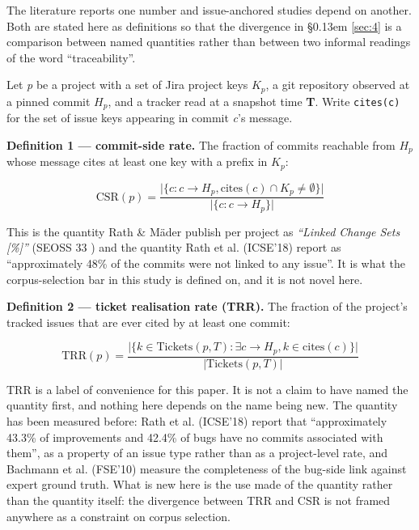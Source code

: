 \documentclass[conference]{IEEEtran}
\begin{document}
The literature reports one number and issue-anchored studies depend on another. Both are stated here as definitions so that the divergence in \S\kern0.13em \ref{sec:4} is a comparison between named quantities rather than between two informal readings of the word ``traceability''.

Let \emph{p} be a project with a set of Jira project keys \textbf{$K_p$}, a git repository observed at a pinned commit \textbf{$H_p$}, and a tracker read at a snapshot time \textbf{T}. Write \texttt{cites(c)} for the set of issue keys appearing in commit \emph{c}'s message.

\textbf{Definition 1 --- commit-side rate.} The fraction of commits reachable from $H_p$ whose message cites at least one key with a prefix in $K_p$:

\[\mathrm{CSR}(p) = \frac{\bigl\lvert\{ c : c \longrightarrow H_p, \mathrm{cites}(c) \cap K_p \neq \emptyset \}\bigr\rvert}{\bigl\lvert\{ c : c \longrightarrow H_p \}\bigr\rvert}\]

This is the quantity Rath \& M\"ader publish per project as \emph{``Linked Change Sets [\%]''} (SEOSS 33 \cite{rath2019seoss}) and the quantity Rath et al. (ICSE'18) \cite{rath2018traceability} report as ``approximately 48\% of the commits were not linked to any issue''. It is what the corpus-selection bar in this study is defined on, and it is not novel here.

\textbf{Definition 2 --- ticket realisation rate (TRR).} The fraction of the project's tracked issues that are ever cited by at least one commit:

\[\mathrm{TRR}(p) = \frac{\bigl\lvert\{ k \in \mathrm{Tickets}(p, T) : \exists c \longrightarrow H_p, k \in \mathrm{cites}(c) \}\bigr\rvert}{\lvert \mathrm{Tickets}(p, T)\rvert}\]

TRR is a label of convenience for this paper. It is not a claim to have named the quantity first, and nothing here depends on the name being new. The quantity has been measured before: Rath et al. (ICSE'18) \cite{rath2018traceability} report that ``approximately 43.3\% of improvements and 42.4\% of bugs have no commits associated with them'', as a property of an issue type rather than as a project-level rate, and Bachmann et al. (FSE'10) \cite{bachmann2010missing} measure the completeness of the bug-side link against expert ground truth. What is new here is the use made of the quantity rather than the quantity itself: the divergence between TRR and CSR is not framed anywhere as a constraint on corpus selection.
\end{document}
